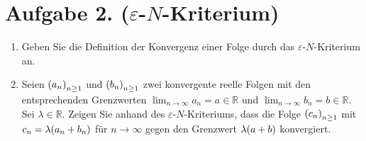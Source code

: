 \documentclass[german,12pt]{homework}
\newcommand{\RR}{\mathbb{R}}
\DeclarePairedDelimiter{\enbrace}{(}{)}
\begin{document}
    \section*{Aufgabe 2. (\(\varepsilon\)-\(N\)-Kriterium)}

    \begin{problem}
        \begin{enumerate}
            \item Geben Sie die Definition der Konvergenz einer Folge durch das \(\varepsilon\)-\(N\)-Kriterium an.
            \item Seien \(\enbrace*{a_n}_{n \ge 1}\) und \(\enbrace*{b_n}_{n \ge 1}\) zwei konvergente reelle Folgen mit den entsprechenden Grenzwerten \(\lim_{n \to \infty}a_n = a \in \RR\) und \(\lim_{n \to \infty}b_n = b \in \RR\). Sei \(\lambda \in \RR\). Zeigen Sie anhand des \(\varepsilon\)-\(N\)-Kriteriums, dass die Folge \(\enbrace*{c_n}_{n \ge 1}\) mit \(c_n = \lambda\enbrace*{a_n + b_n}\) für \(n \to \infty\) gegen den Grenzwert \(\lambda\enbrace*{a + b}\) konvergiert.
        \end{enumerate}
    \end{problem}
\end{document}
